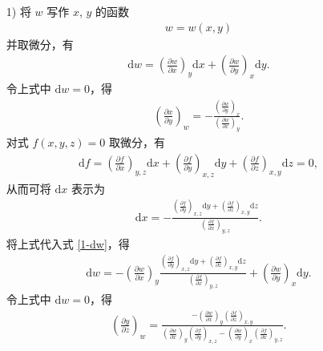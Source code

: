 \documentclass{assignment}
\begin{document}
\begin{pf}
    \begin{itemize}
        \item[1)] 将 $w$ 写作 $x$, $y$ 的函数
        \begin{align}
            w=w(x,y)
        \end{align}
        并取微分，有
        \begin{align}
            \label{1-dw}
            \mathrm{d}w=\left(\frac{\partial w}{\partial x}\right)_y\mathrm{d}x+\left(\frac{\partial w}{\partial y}\right)_x\mathrm{d}y.
        \end{align}
        令上式中 $\mathrm{d}w=0$，得
        \begin{align}
            \label{1-(dx/dy)w}
            \left(\frac{\partial x}{\partial y}\right)_w=-\frac{\left(\frac{\partial w}{\partial y}\right)_x}{\left(\frac{\partial w}{\partial x}\right)_y}.
        \end{align}
        对式 $f(x,y,z)=0$ 取微分，有
        \begin{align}
            \label{1-df}
            \mathrm{d}f=\left(\frac{\partial f}{\partial x}\right)_{y,z}\mathrm{d}x+\left(\frac{\partial f}{\partial y}\right)_{x,z}\mathrm{d}y+\left(\frac{\partial f}{\partial z}\right)_{x,y}\mathrm{d}z=0,
        \end{align}
        从而可将 $\mathrm{d}x$ 表示为
        \begin{align}
            \mathrm{d}x=-\frac{\left(\frac{\partial f}{\partial y}\right)_{x,z}\mathrm{d}y+\left(\frac{\partial f}{\partial z}\right)_{x,y}\mathrm{d}z}{\left(\frac{\partial f}{\partial x}\right)_{y,z}}.
        \end{align}
        将上式代入式 \eqref{1-dw}，得
        \begin{align}
            \mathrm{d}w=-\left(\frac{\partial w}{\partial x}\right)_y\frac{\left(\frac{\partial f}{\partial y}\right)_{x,z}\mathrm{d}y+\left(\frac{\partial f}{\partial z}\right)_{x,y}\mathrm{d}z}{\left(\frac{\partial f}{\partial x}\right)_{y,z}}+\left(\frac{\partial w}{\partial y}\right)_x\mathrm{d}y.
        \end{align}
        令上式中 $\mathrm{d}w=0$，得
        \begin{align}
            \label{1-(dy/dz)w}
            \left(\frac{\partial y}{\partial z}\right)_w=\frac{-\left(\frac{\partial w}{\partial x}\right)_y\left(\frac{\partial f}{\partial z}\right)_{x,y}}{\left(\frac{\partial w}{\partial x}\right)_y\left(\frac{\partial f}{\partial y}\right)_{x,z}-\left(\frac{\partial w}{\partial y}\right)_x\left(\frac{\partial f}{\partial x}\right)_{y,z}}.

\end{align}
\end{itemize}
\end{pf}
\end{document}
